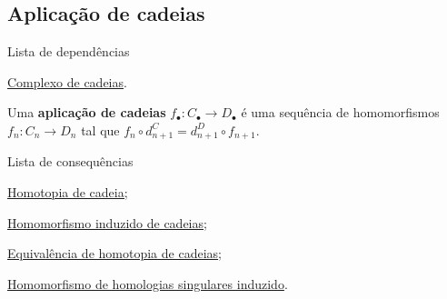 \subsection{Aplicação de cadeias}
\label{aplicacao-de-cadeias-def}
\begin{titlemize}{Lista de dependências}
	\item \hyperref[complexo-de-cadeias-def]{Complexo de cadeias}.\\ %
\end{titlemize}

\begin{defi}
    Uma \textbf{aplicação de cadeias} $f_\bullet:C_\bullet\rightarrow D_\bullet$ é uma sequência de homomorfismos $f_n:C_n\rightarrow D_n$ tal que $f_n\circ d_{n+1}^C=d_{n+1}^D\circ f_{n+1}$.
\end{defi}

\begin{titlemize}{Lista de consequências}
    \item \hyperref[homotopia-de-cadeias-def]{Homotopia de cadeia;}\\
    \item \hyperref[homomorfismo-induzido-de-cadeias-prop]{Homomorfismo induzido de cadeias};\\
    \item \hyperref[equivalencia-de-homotopia-de-cadeias-def]{Equivalência de homotopia de cadeias};\\
    \item \hyperref[homomorfismo-de-homologias-singulares-induzido-prop]{Homomorfismo de homologias singulares induzido}.
\end{titlemize}
